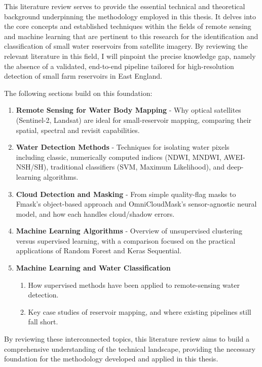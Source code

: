

This literature review serves to provide the essential technical and theoretical background underpinning the methodology employed in this thesis. It delves into the core concepts and established techniques within the fields of remote sensing and machine learning that are pertinent to this research for the identification and classification of small water reservoirs from satellite imagery. By reviewing the relevant literature in this field, I will pinpoint the precise knowledge gap, namely the absence of a validated, end-to-end pipeline tailored for high-resolution detection of small farm reservoirs in East England.

The following sections build on this foundation:
\begin{enumerate}
    \item \textbf{Remote Sensing for Water Body Mapping} - Why optical satellites (Sentinel-2, Landsat) are ideal for small-reservoir mapping, comparing their spatial, spectral and revisit capabilities.
    \item \textbf{Water Detection Methods} - Techniques for isolating water pixels including classic, numerically computed indices (NDWI, MNDWI, AWEI-NSH/SH), traditional classifiers (SVM, Maximum Likelihood), and deep-learning algorithms.
    \item \textbf{Cloud Detection and Masking} - From simple quality-flag masks to Fmask’s object-based approach and OmniCloudMask’s sensor-agnostic neural model, and how each handles cloud/shadow errors.
    \item \textbf{Machine Learning Algorithms} - Overview of unsupervised clustering versus supervised learning, with a comparison focused on the practical applications of Random Forest and Keras Sequential.
    \item \textbf{Machine Learning and Water Classification}
    \begin{enumerate}
        \item How supervised methods have been applied to remote-sensing water detection.  
        \item Key case studies of reservoir mapping, and where existing pipelines still fall short.
    \end{enumerate}
\end{enumerate}

By reviewing these interconnected topics, this literature review aims to build a comprehensive understanding of the technical landscape, providing the necessary foundation for the methodology developed and applied in this thesis.

